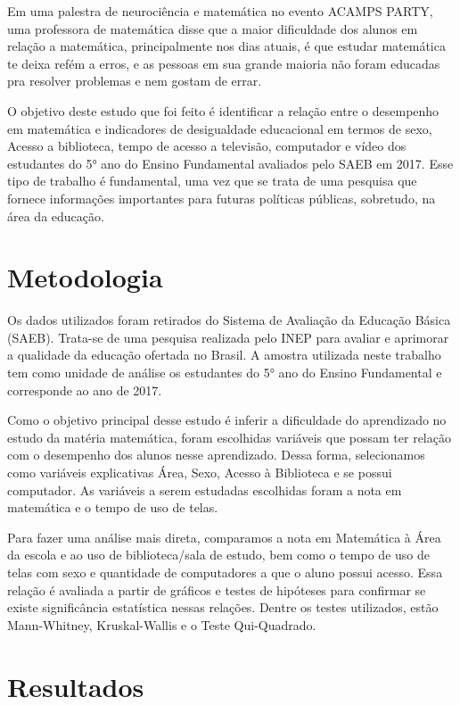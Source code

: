 \documentclass[a4paper, 12pt]{article} %
\begin{document}
Em uma palestra de neurociência e matemática no evento ACAMPS PARTY, uma professora de matemática disse que a maior dificuldade dos alunos em relação a matemática, principalmente nos dias atuais, é que estudar matemática te deixa refém a erros, e as pessoas em sua grande maioria não foram educadas pra resolver problemas e nem gostam de errar. 

O objetivo deste estudo que foi feito é identificar a relação entre o desempenho em matemática e indicadores de desigualdade educacional em termos de sexo, Acesso a biblioteca, tempo de acesso a televisão, computador e vídeo dos estudantes do 5° ano do Ensino Fundamental avaliados pelo SAEB em 2017. Esse tipo de trabalho é fundamental, uma vez que se trata de uma pesquisa que fornece informações importantes para futuras políticas públicas, sobretudo, na área da educação.

\section{Metodologia}
Os dados utilizados foram retirados do Sistema de Avaliação da Educação Básica (SAEB). Trata-se de uma pesquisa realizada pelo INEP para avaliar e aprimorar a qualidade da educação ofertada no Brasil. A amostra utilizada neste trabalho tem como unidade de análise os estudantes do 5° ano do Ensino Fundamental e corresponde ao ano de 2017.

Como o objetivo principal desse estudo é inferir a dificuldade do aprendizado no estudo da matéria matemática, foram escolhidas variáveis que possam ter relação com o desempenho dos alunos nesse aprendizado. Dessa forma, selecionamos como variáveis explicativas Área, Sexo, Acesso à Biblioteca e se possui computador. As variáveis a serem estudadas escolhidas foram a nota em matemática e o tempo de uso de telas.

Para fazer uma análise mais direta, comparamos a nota em Matemática à Área da escola e ao uso de biblioteca/sala de estudo, bem como o tempo de uso de telas com sexo e quantidade de computadores a que o aluno possui acesso. Essa relação é avaliada a partir de gráficos e testes de hipóteses para confirmar se existe significância estatística nessas relações. Dentre os testes utilizados, estão Mann-Whitney, Kruskal-Wallis e o Teste Qui-Quadrado.

\section{Resultados}
\end{document}
